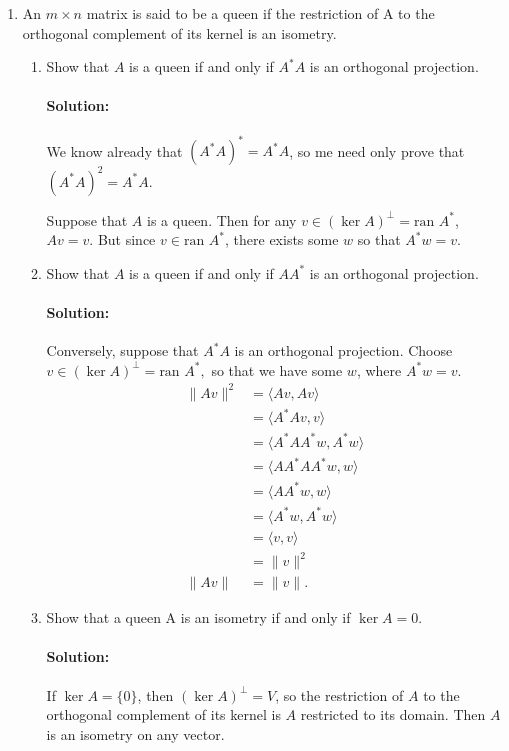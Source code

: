 \documentclass{article}
\begin{document}
\begin{enumerate} 

\item An $m \times n$ matrix is said to be a queen if the restriction of A to the orthogonal complement of its kernel is an isometry.

\begin{enumerate}[label= (\alph*)] 
\item Show that $A$ is a queen if and only if $A^* A$ is an orthogonal projection.
    \paragraph{Solution: } We know already that $(A^* A)^* =A^* A$, so me need only prove that $(A^* A)^2=A^* A$.

    Suppose that $A$ is a queen. Then for any $v\in (\ker A)^{\perp}=\text{ran }A^* $, $Av=v$. But since  $v\in \text{ran }A^* $, there exists some $w$ so that $A^* w=v$.



\item Show that $A$ is a queen if and only if $AA^*$ is an orthogonal projection.
    \paragraph{Solution: }

    Conversely, suppose that $A^* A$ is an orthogonal projection. Choose $v\in (\ker A)^{\perp}=\text{ran }A^{*},$ so that we have some $w$, where  $A^* w=v$.
    \begin{align*}
        \|Av\|^2&=\langle Av,Av \rangle\\
                &=\langle A^* Av,v \rangle\\
                &=\langle A^* A A^* w,A^* w \rangle\\
                &=\langle AA^* A A^* w, w \rangle\\
                &=\langle AA^*w, w \rangle\\
                &=\langle A^*w, A^* w \rangle\\
                &=\langle v,v\rangle\\
                &= \|v\|^2 \\
        \|Av\|&=\|v\|
    .\end{align*}
\item Show that a queen A is an isometry if and only if $\ker A = {0}$.

    \paragraph{Solution: }If $\ker A=\{0\} $, then $(\ker A)^{\perp}=V$, so the restriction of $A$ to the orthogonal complement of its kernel is $A$ restricted to its domain. Then $A$ is an isometry on any vector.


\end{enumerate}
\end{enumerate}
\end{document}
